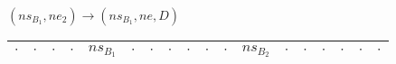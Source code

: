 \documentclass[12pt]{beamer}
\begin{document}
\begin{frame}{}
\begin{center}
\begin{tabular}{|c|c|c|c|c|c|c|c|c|c|c|c|c|c|c|c|c|c|}
\end{tabular}\\

        \pause

\vspace{0.5cm}

    $(ns_{B_1},ne_2) \longrightarrow (ns_{B_1}, ne, D)$\\
    

\begin{tabular}{|c|c|c|c|c|c|c|c|c|c|c|c|c|c|c|c|c|c|}\hline
     $\cdot$ & $\cdot$ & $\cdot$ & $\cdot$ & $ns_{B_1}$ & $\cdot$ & $\cdot$ & $\cdot$ & $\cdot$ & $\cdot$ & $\cdot$ & $ns_{B_2}$ & $\cdot$ & $\cdot$ & $\cdot$ & $\cdot$ & $\cdot$ & $\cdot$ \\\hline    
     
\end{tabular}\\

    \end{center}
\end{frame}
\end{document}
